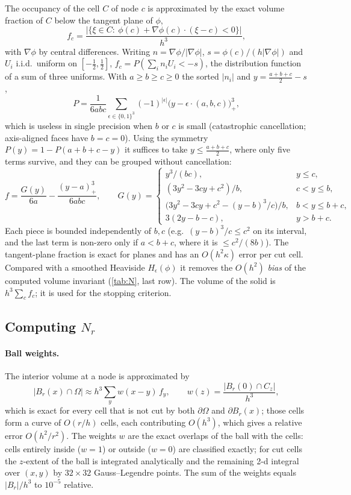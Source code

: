 \documentclass[11pt]{article}
\begin{document}
The occupancy of the cell $C$ of node $c$ is approximated by the exact volume fraction of $C$ below the
tangent plane of $\phi$,
\begin{equation}
f_c=\frac{|\{\xi\in C:\ \phi(c)+\nabla\phi(c)\cdot(\xi-c)<0\}|}{h^3},
\end{equation}
with $\nabla\phi$ by central differences. Writing $n=\nabla\phi/|\nabla\phi|$, $s=\phi(c)/(h|\nabla\phi|)$
and $U_i$ i.i.d.\ uniform on $[-\frac12,\frac12]$, $f_c=P(\sum_i n_iU_i<-s)$, the distribution function of
a sum of three uniforms. With $a\ge b\ge c\ge0$ the sorted $|n_i|$ and $y=\frac{a+b+c}{2}-s$,
\[
P=\frac{1}{6abc}\sum_{\epsilon\in\{0,1\}^3}(-1)^{|\epsilon|}\big(y-\epsilon\cdot(a,b,c)\big)_+^3,
\]
which is useless in single precision when $b$ or $c$ is small (catastrophic cancellation; axis-aligned
faces have $b=c=0$). Using the symmetry $P(y)=1-P(a+b+c-y)$ it suffices to take $y\le\frac{a+b+c}2$, where
only five terms survive, and they can be grouped without cancellation:
\[
f=\frac{G(y)}{6a}-\frac{(y-a)_+^3}{6abc},\qquad
G(y)=\begin{cases}
y^3/(bc), & y\le c,\\
(3y^2-3cy+c^2)/b, & c<y\le b,\\
\big(3y^2-3cy+c^2-(y-b)^3/c\big)/b, & b<y\le b+c,\\
3(2y-b-c), & y>b+c.
\end{cases}
\]
Each piece is bounded independently of $b,c$ (e.g.\ $(y-b)^3/c\le c^2$ on its interval, and the last term
is non-zero only if $a<b+c$, where it is $\le c^2/(8b)$). The tangent-plane fraction is exact for planes and
has an $O(h^2\kappa)$ error per cut cell. Compared with a smoothed Heaviside $H_\epsilon(\phi)$ it removes
the $O(h^2)$ \emph{bias} of the computed volume invariant (\cref{tab:N}, last row). The volume of the solid
is $h^3\sum_c f_c$; it is used for the stopping criterion.

\subsection{\texorpdfstring{Computing $N_r$}{Computing N\_r}}\label{sec:svi}

\paragraph{Ball weights.} The interior volume at a node is approximated by
\begin{equation}\label{eq:conv}
|B_r(x)\cap\Omega|\approx h^3\sum_y w(x-y)\,f_y,\qquad w(z)=\frac{|B_r(0)\cap C_z|}{h^3},
\end{equation}
which is exact for every cell that is not cut by both $\partial\Omega$ and $\partial B_r(x)$; those
cells form a curve of $O(r/h)$ cells, each contributing $O(h^3)$, which gives a relative error
$O(h^2/r^2)$. The weights $w$ are the exact overlaps of the ball with the cells: cells entirely inside
($w=1$) or outside ($w=0$) are classified exactly; for cut cells the $z$-extent of the ball is integrated
analytically and the remaining 2-d integral over $(x,y)$ by $32\times32$ Gauss--Legendre points. The sum of
the weights equals $|B_r|/h^3$ to $10^{-5}$ relative.
\end{document}
